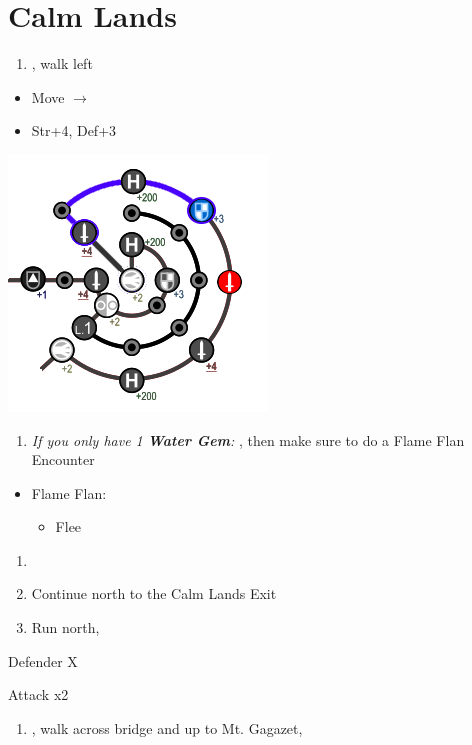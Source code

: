 \chapter{Calm Lands}

\begin{enumerate}
  \item \sd, walk left
\end{enumerate}
\begin{spheregrid}
  \begin{itemize}
  \yunaf
  \begin{itemize}
	\item Move $\rightarrow$
  	\item Str+4, Def+3
	\end{itemize}
  \includegraphics[width=.5\columnwidth]{graphics/yuna_blitz_loss_highbridge_2}
\end{itemize}
\end{spheregrid}
\begin{enumerate}[resume]
  \item \textit{If you only have 1 \textbf{Water Gem}:} \formation{\tidus}{\auron}{\yuna}, then make sure to do a Flame Flan Encounter
\end{enumerate}
\begin{encounters}
\begin{itemize}
\item Flame Flan:
\begin{itemize}
\kimahrif Steal
\item Flee
\end{itemize}
\end{itemize}
\end{encounters}
\begin{enumerate}[resume]
  \item \formation{\tidus}{\kimahri}{\auron}
  \item Continue north to the Calm Lands Exit
  \item Run north, \sd
\end{enumerate}
\begin{battle}[64000]{Defender X}
  \begin{itemize}
    \switch{\tidus}{\yuna}
    \summon{\bahamut}
    \bahamutf Attack x2
  \end{itemize}
\end{battle}
\begin{enumerate}[resume]
  \item \sd, walk across bridge and up to Mt. Gagazet, \sd
\end{enumerate}
